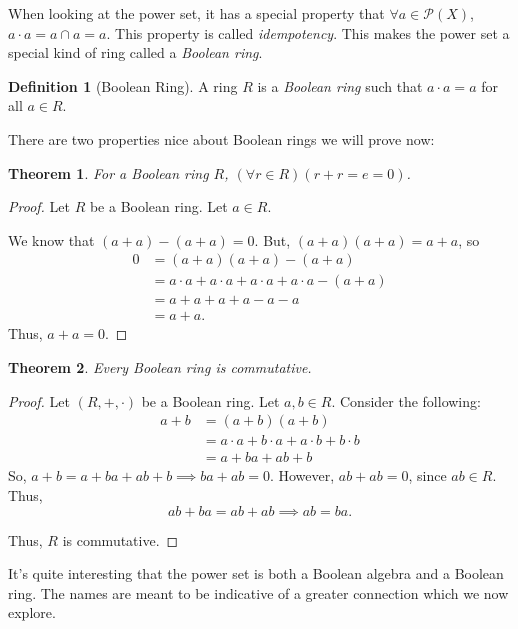 \documentclass[10pt, letterpaper]{article}
\newcommand{\powerset}[1]{\mathcal{P}(#1)}
\newtheorem{theorem}{Theorem}
\theoremstyle{definition}
\newtheorem{definition}{Definition}[section]
\begin{document}
When looking at the power set, it has a special property that \(\forall a\in\powerset{X}\),
\(a\cdot a = a\cap a = a\). This property is called \textit{idempotency}.
This makes the power set a special kind of ring called a \textit{Boolean ring}. 

\begin{definition}[Boolean Ring]
	A ring \(R\) is a \textit{Boolean ring} such that \(a\cdot a = a\) for all \(a\in R\).
\end{definition}

There are two properties nice about Boolean rings we will prove now:
\begin{theorem}\label{thm_char_br}
	For a Boolean ring \(R\), \((\forall r\in R)(r+r=e=0)\).
\end{theorem}
\begin{proof}
	Let \(R\) be a Boolean ring. Let \(a\in R\).
	
	We know that \((a+a)-(a+a) = 0\). But, \((a+a)(a+a) = a+a\), so
	\begin{align*}
			0&=(a+a)(a+a)-(a+a)\\
			 &=a\cdot a + a\cdot a + a\cdot a + a\cdot a - (a + a)\\
			 &=a + a + a + a - a - a \\
			 &= a + a.
	\end{align*}
	Thus, \(a+a = 0\).
\end{proof}

\begin{theorem}\label{thm_comm_br}
	Every Boolean ring is commutative.
\end{theorem}
\begin{proof}
	Let \((R, +, \cdot)\) be a Boolean ring. Let \(a,b\in R\).
	Consider the following:
	\begin{align*}
		a + b&= (a+b)(a+b)\\
			 &= a\cdot a + b\cdot a + a\cdot b + b\cdot b \\
			 &= a + ba + ab + b
	\end{align*}
	So, \(a+b=a + ba + ab + b\implies ba + ab = 0\). However, \(ab + ab = 0\), since
	\(ab\in R\). Thus,
	\[ab + ba = ab + ab\implies ab = ba.\]

	Thus, \(R\) is commutative.

\end{proof}

It's quite interesting that the power set is both a Boolean algebra and a Boolean ring.
The names are meant to be indicative of a greater connection which we now explore.
\end{document}
